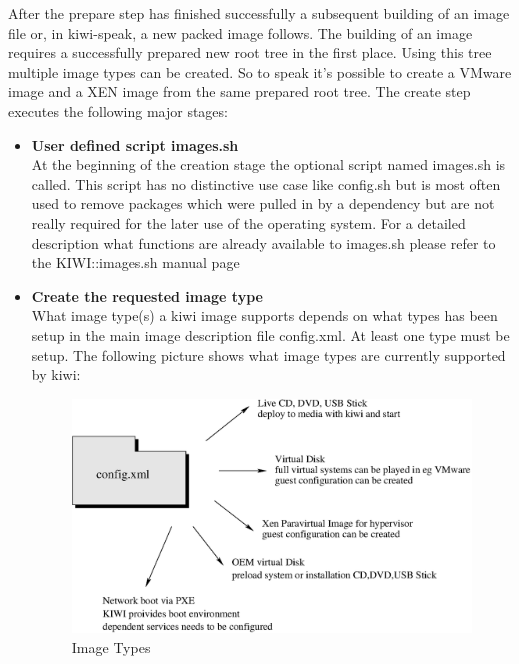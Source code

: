 After the prepare step has finished successfully a subsequent building of
an image file or, in kiwi-speak, a new packed image follows.
The building of an image requires a successfully prepared new root
tree in the first place. Using this tree multiple image types can be
created. So to speak it's possible to create a VMware image and a
XEN image from the same prepared root tree. The create step executes the
following major stages:

\begin{itemize}
\item \textbf{User defined script images.sh}\\
      At the beginning of the creation stage the optional script named
      images.sh is called. This script has no distinctive use case like
      config.sh but is most often used to remove packages which were pulled
      in by a dependency but are not really required for the later use
      of the operating system. For a detailed description what
      functions are already available to images.sh please refer to
      the KIWI::images.sh manual page
\item \textbf{Create the requested image type}\\
      What image type(s) a kiwi image supports depends on what types has been
      setup in the main image description file config.xml. At least one type
      must be setup. The following picture shows what image types are
      currently supported by kiwi:

      \begin{figure}[h]
      \centering
      \includegraphics[scale=0.5]{pictures/types.eps}
      \caption{Image Types}
      \label{fig:types}
      \end{figure}
\end{itemize}

